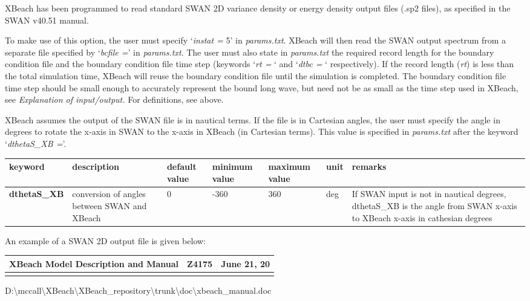 XBeach has been programmed to read standard SWAN 2D variance density or energy density output files (.sp2 files), as specified in the SWAN v40.51 manual. 

To make use of this option, the user must specify `\textit{instat =} 5' in \textit{params.txt}. XBeach will then read the SWAN output spectrum from a separate file specified by `\textit{bcfile =}' in \textit{params.txt}. The user must also state in \textit{params.txt} the required record length for the boundary condition file and the boundary condition file time step (keywords `\textit{rt =} ` and `\textit{dtbc =} ` respectively). If the record length (\textit{rt}) is less than the total simulation time, XBeach will reuse the boundary condition file until the simulation is completed. The boundary condition file time step should be small enough to accurately represent the bound long wave, but need not be as small as the time step used in XBeach, see \textit{Explanation of input/output.} For definitions, see above.

XBeach assumes the output of the SWAN file is in nautical terms. If the file is in Cartesian angles, the user must specify the angle in degrees to rotate the x-axis in SWAN to the x-axis in XBeach (in Cartesian terms). This value is specified in \textit{params.txt} after the keyword `\textit{dthetaS\_XB =}'. 

\begin{tabular}{|p{0.6in}|p{0.7in}|p{0.4in}|p{0.5in}|p{0.5in}|p{0.3in}|p{0.9in}|} \hline 
keyword & description & default value & minimum value & maximum value & unit & remarks \\ \hline 
\textbf{dthetaS\_XB} & conversion of angles between SWAN and XBeach & 0 & -360 & 360 & deg & If SWAN input is not in nautical degrees, dthetaS\_XB is the angle from SWAN x-axis to XBeach x-axis in cathesian degrees\newline        \\ \hline 
\end{tabular}

An example of a SWAN 2D output file is given below:

\begin{tabular}{|p{1.5in}|p{1.5in}|p{1.5in}|} \hline 
XBeach Model Description and Manual & Z4175 & June 21, 20 \\ \hline 
&  &  \\ \hline 
\end{tabular}

D:\textbackslash mccall\textbackslash XBeach\textbackslash XBeach\_repository\textbackslash trunk\textbackslash doc\textbackslash xbeach\_manual.doc


